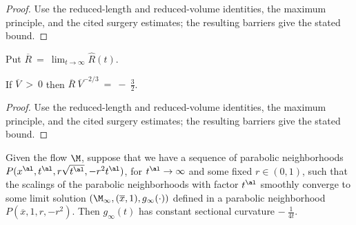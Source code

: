 \begin{proof}
\sketch Use the reduced-length and reduced-volume identities, the maximum principle, and the cited surgery estimates; the resulting barriers give the stated bound.
\end{proof}

Put $\overline{R} \: = \: \lim_{t \rightarrow \infty} \hat{R}(t)$.

\begin{lemma}
  \label{lem:kl-noncollapsed-pointed-limits-hyperbolic-noncollapsing-lemma-5}
 \label{RVlemma}
If $\overline{V} \: > \: 0$ then
$\overline{R} \: \overline{V}^{-2/3} \: = \: - \: \frac32$.
\end{lemma}

\begin{proof}
\sketch Use the reduced-length and reduced-volume identities, the maximum principle, and the cited surgery estimates; the resulting barriers give the stated bound.
\end{proof}

\begin{proposition}
  \label{prop:kl-noncollapsed-pointed-limits-hyperbolic-convergence-noncollapsing}
 \label{propII.7.1}
Given the flow $\M$,
suppose that we have a sequence of parabolic neighborhoods
$P(x^\al, t^\al, r \sqrt{t^\al}, - r^2 t^\al)$, for
$t^\al \rightarrow \infty$ and some fixed $r \in (0,1)$, such that
the scalings of the parabolic neighborhoods with factor
$t^\al$ smoothly converge to some limit
solution $(\M_\infty, (\overline{x}, 1), g_\infty(\cdot))$
defined in a parabolic neighborhood
$P(\overline{x}, 1, r, -r^2)$. Then $g_\infty(t)$ has
constant sectional curvature $- \: \frac{1}{4t}$.
\end{proposition}

